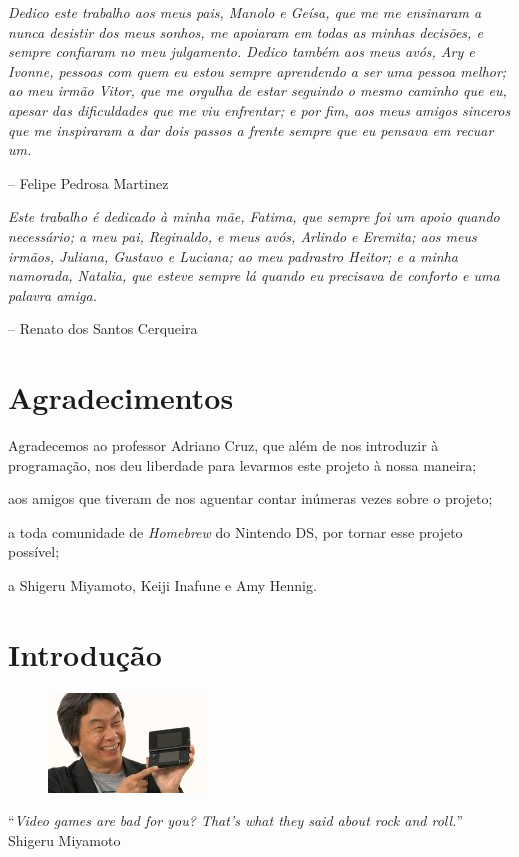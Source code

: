 \documentclass[brazil]{abnt}
\begin{document}
\textit{Dedico este trabalho aos meus pais, Manolo e Geísa, que me me ensinaram a nunca desistir dos meus sonhos, me apoiaram em todas as minhas decisões, e sempre confiaram no meu julgamento. Dedico também aos meus avós, Ary e Ivonne, pessoas com quem eu estou sempre aprendendo a ser uma pessoa melhor; ao meu irmão Vitor, que me orgulha de estar seguindo o mesmo caminho que eu, apesar das dificuldades que me viu enfrentar; e por fim, aos meus amigos sinceros que me inspiraram a dar dois passos a frente sempre que eu pensava em recuar um.}

\hfill -- Felipe Pedrosa Martinez

\textit{Este trabalho é dedicado à minha mãe, Fatima, que sempre foi um apoio quando necessário; a meu pai, Reginaldo, e meus avós, Arlindo e Eremita; aos meus irmãos, Juliana, Gustavo e Luciana; ao meu padrastro Heitor; e a minha namorada, Natalia, que esteve sempre lá quando eu precisava de conforto e uma palavra amiga.}

\hfill -- Renato dos Santos Cerqueira

\chapter*{Agradecimentos}

Agradecemos ao professor Adriano Cruz, que além de nos introduzir à programação, nos deu liberdade para levarmos este projeto à nossa maneira;

aos amigos que tiveram de nos aguentar contar inúmeras vezes sobre o projeto;

a toda comunidade de \textit{Homebrew} do Nintendo DS, por tornar esse projeto possível;

a Shigeru Miyamoto, Keiji Inafune e Amy Hennig.

\tableofcontents{}
\listoffigures

\chapter{Introdução\label{cap:introducao}}

\vfill{}
\begin{flushright}{}
\begin{figure}[h!]
\hfill\includegraphics{imgs/shigeru.jpg}
\end{figure}
``\emph{Video games are bad for you? That's what they said about rock and roll.}''\\
{\small Shigeru Miyamoto}\end{flushright}{\small \par}
\vfill{}
\end{document}
